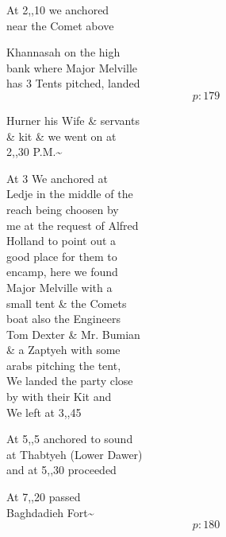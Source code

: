 \documentclass{report}
\begin{document}
	\par{
 	At 2,,10 we anchored\ \\near the Comet above\ \\
	}

	\par{
 	Khannasah on the high\ \\bank where Major Melville\ \\has 3 Tents pitched, landed\ \\
  \[p: 179 \]

	}



	\par{
 	Hurner his Wife \& servants\ \\\& kit \& we went on at\ \\2,,30 P.M.\~{}\ \\
	}

	\par{
 	At 3 We anchored at\ \\Ledje in the middle of the\ \\reach being choosen by\ \\me at the request of Alfred\ \\Holland to point out a\ \\good place for them to\ \\encamp, here we found\ \\Major Melville with a\ \\small tent \& the Comets\ \\boat also the Engineers\ \\Tom Dexter \& Mr. Bumian\ \\\& a Zaptyeh with some\ \\arabs pitching the tent,\ \\We landed the party close\ \\by with their Kit and\ \\We left at 3,,45\ \\
	}

	\par{
 	At 5,,5 anchored to sound\ \\at Thabtyeh (Lower Dawer)\ \\and at 5,,30 proceeded\ \\
	}

	\par{
 	At 7,,20 passed\ \\Baghdadieh Fort\~{}\ \\
  \[p: 180 \]

	}
\end{document}

